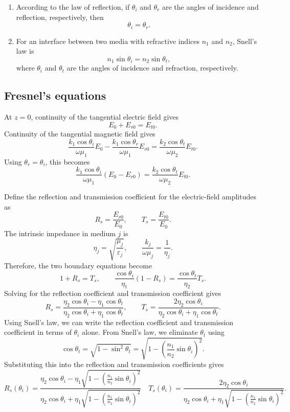 \documentclass[10pt,a4paper]{article}
\begin{document}
\begin{theorem}
\begin{enumerate}
    \item According to the \textnormal{\textcolor{red!70!black}{\textsf{law of reflection}}},
    if \(\theta_i\) and \(\theta_r\) are the angles of incidence and reflection,
    respectively, then
    \[
        \theta_i=\theta_r.
    \]

    \item For an interface between two media with refractive indices \(n_1\)
    and \(n_2\), \textnormal{\textcolor{red!70!black}{\textsf{Snell's law}}} is
    \[
        n_1\sin\theta_i=n_2\sin\theta_t,
    \]
    where \(\theta_i\) and \(\theta_t\) are the angles of incidence and
    refraction, respectively.
\end{enumerate}
\end{theorem}

\subsection{Fresnel's equations}
At \(z=0\), continuity of the tangential electric field gives
\[
E_0+E_{r0}=E_{t0}.
\]
Continuity of the tangential magnetic field gives
\[
\frac{k_1\cos\theta_i}{\omega\mu_1}E_0
-
\frac{k_1\cos\theta_r}{\omega\mu_1}E_{r0}
=
\frac{k_2\cos\theta_t}{\omega\mu_2}E_{t0}.
\]
Using \(\theta_r=\theta_i\), this becomes
\[
\frac{k_1\cos\theta_i}{\omega\mu_1}(E_0-E_{r0})
=
\frac{k_2\cos\theta_t}{\omega\mu_2}E_{t0}.
\]

Define the \textcolor{red!70!black}{\textsf{reflection}}
and \textcolor{red!70!black}{\textsf{transmission coefficient}} for the
electric-field amplitudes as
\[
R_s=\frac{E_{r0}}{E_0},
\qquad
T_s=\frac{E_{t0}}{E_0}.
\]
The \textcolor{red!70!black}{\textsf{intrinsic impedance}} in medium \(j\) is
\[
\eta_j=\sqrt{\frac{\mu_j}{\varepsilon_j}},
\qquad
\frac{k_j}{\omega\mu_j}=\frac{1}{\eta_j}.
\]
Therefore, the two boundary equations become
\[
1+R_s=T_s,
\qquad
\frac{\cos\theta_i}{\eta_1}(1-R_s)
=
\frac{\cos\theta_t}{\eta_2}T_s.
\]
Solving for the \textcolor{red!70!black}{\textsf{reflection coefficient}}
and \textcolor{red!70!black}{\textsf{transmission coefficient}} gives
\[
R_s=
\frac{\eta_2\cos\theta_i-\eta_1\cos\theta_t}
     {\eta_2\cos\theta_i+\eta_1\cos\theta_t},
\qquad
T_s=
\frac{2\eta_2\cos\theta_i}
     {\eta_2\cos\theta_i+\eta_1\cos\theta_t}.
\]
Using Snell's law, we can write the
\textcolor{red!70!black}{\textsf{reflection coefficient}} and
\textcolor{red!70!black}{\textsf{transmission coefficient}} in terms of
\(\theta_i\) alone. From Snell's law, we eliminate \(\theta_t\) using
\[
\cos\theta_t
=
\sqrt{1-\sin^2\theta_t}
=
\sqrt{1-\left(\frac{n_1}{n_2}\sin\theta_i\right)^2}.
\]
Substituting this into the reflection and transmission coefficients gives
\[
R_s(\theta_i)
=
\frac{\eta_2\cos\theta_i
-\eta_1\sqrt{1-\left(\frac{n_1}{n_2}\sin\theta_i\right)^2}}
{\eta_2\cos\theta_i
+\eta_1\sqrt{1-\left(\frac{n_1}{n_2}\sin\theta_i\right)^2}}
\quad
T_s(\theta_i)
=
\frac{2\eta_2\cos\theta_i}
{\eta_2\cos\theta_i
+\eta_1\sqrt{1-\left(\frac{n_1}{n_2}\sin\theta_i\right)^2}}.
\]
\end{document}
